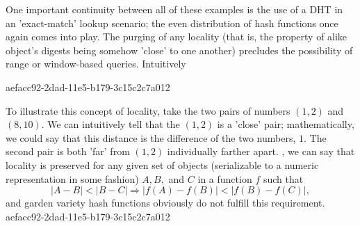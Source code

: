 \documentclass[12pt]{article}
\begin{document}
\par One important continuity between all of these examples is the use of a DHT in an 'exact-match' lookup scenario; the even distribution of hash functions once again comes into play. The purging of any locality (that is, the property of alike object's digests being somehow 'close' to one another) precludes the possibility of range or window-based queries. Intuitively

aefacc92-2dad-11e5-b179-3c15c2c7a012\par To illustrate this concept of locality, take the two pairs of numbers $(1,2)$ and $(8,10)$. We can intuitively tell that the $(1,2)$ is a 'close' pair; mathematically, we could say that this distance is the difference of the two numbers, $1$. The second pair is both 'far' from $(1,2)$ individually farther apart. , we can say that locality is preserved for any given set of objects (serializable to a numeric representation in some fashion) $A,B,$ and $C$ in a function $f$ such that
\begin{equation}
|A-B| < |B-C| \Rightarrow |f(A)-f(B)| < |f(B) - f(C)|,
\end{equation}
and garden variety hash functions obviously do not fulfill this requirement.
aefacc92-2dad-11e5-b179-3c15c2c7a012
\printbibliography
\end{document}
